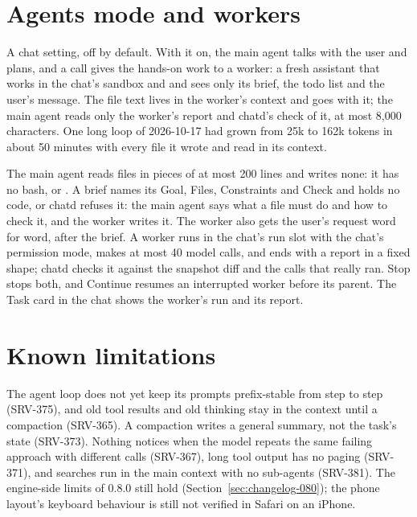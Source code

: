 \section{Agents mode and workers}\label{sec:chat-agents}

A chat setting, off by default. With it on, the main agent talks with the user and plans, and a  call gives the hands-on work to a worker: a fresh assistant that works in the chat's sandbox and  and sees only its brief, the todo list and the user's message. The file text lives in the worker's context and goes with it; the main agent reads only the worker's report and chatd's check of it, at most 8{,}000 characters. One long loop of 2026-10-17 had grown from 25k to 162k tokens in about 50 minutes with every file it wrote and read in its context.

The main agent reads files in pieces of at most 200 lines and writes none: it has no bash,  or . A brief names its Goal, Files, Constraints and Check and holds no code, or chatd refuses it: the main agent says what a file must do and how to check it, and the worker writes it. The worker also gets the user's request word for word, after the brief. A worker runs in the chat's run slot with the chat's permission mode, makes at most 40 model calls, and ends with a report in a fixed shape; chatd checks it against the snapshot diff and the calls that really ran. Stop stops both, and Continue resumes an interrupted worker before its parent. The Task card in the chat shows the worker's run and its report.

\section{Known limitations}\label{sec:chat-limits}

The agent loop does not yet keep its prompts prefix-stable from step to step (SRV-375), and old tool results and old thinking stay in the context until a compaction (SRV-365). A compaction writes a general summary, not the task's state (SRV-373). Nothing notices when the model repeats the same failing approach with different calls (SRV-367), long tool output has no paging (SRV-371), and searches run in the main context with no sub-agents (SRV-381). The engine-side limits of 0.8.0 still hold (Section~\ref{sec:changelog-080}); the phone layout's keyboard behaviour is still not verified in Safari on an iPhone.
